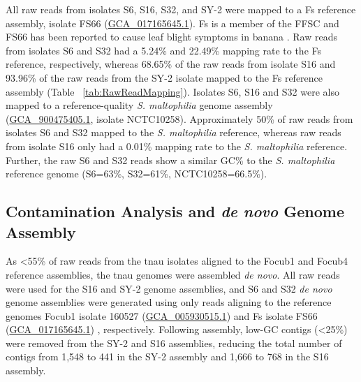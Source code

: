 All raw reads from isolates S6, S16, S32, and SY-2 were mapped to a \acf{Fs} reference assembly, isolate FS66 (\href{https://www.ncbi.nlm.nih.gov/datasets/genome/GCA_017165645.1/}{GCA\_017165645.1}). \ac{Fs} is a member of the \ac{FFSC} and FS66 has been reported to cause leaf blight symptoms in banana \parencite{Cui2021}. Raw reads from isolates S6 and S32 had a 5.24\% and 22.49\% mapping rate to the \ac{Fs} reference, respectively, whereas 68.65\% of the raw reads from isolate S16 and 93.96\% of the raw reads from the SY-2 isolate mapped to the \ac{Fs} reference assembly (Table ~\ref{tab:RawReadMapping}). Isolates S6, S16 and S32 were also mapped to a reference-quality \textit{S. maltophilia} genome assembly (\href{https://www.ncbi.nlm.nih.gov/datasets/genome/GCF_900475405.1/}{GCA\_900475405.1}, isolate NCTC10258). Approximately 50\% of raw reads from isolates S6 and S32 mapped to the \textit{S. maltophilia} reference, whereas raw reads from isolate S16 only had a 0.01\% mapping rate to the \textit{S. maltophilia} reference. Further, the raw S6 and S32 reads show a similar GC\% to the \textit{S. maltophilia} reference genome (S6=63\%, S32=61\%, NCTC10258=66.5\%).

\bigskip


\subsection{Contamination Analysis and \textit{de novo} Genome Assembly}

As <55\% of raw reads from the \ac{tnau} isolates aligned to the \ac{Focub1} and \ac{Focub4} reference assemblies, the \ac{tnau} genomes were assembled \textit{de novo}. All raw reads were used for the S16 and SY-2 genome assemblies, and S6 and S32 \textit{de novo} genome assemblies were generated using only reads aligning to the reference genomes \ac{Focub1} isolate 160527 (\href{https://www.ncbi.nlm.nih.gov/datasets/genome/GCA_005930515.1/}{GCA\_005930515.1}) \parencite{Asai2019} and \ac{Fs} isolate FS66 (\href{https://www.ncbi.nlm.nih.gov/datasets/genome/GCA_017165645.1/}{GCA\_017165645.1}) \parencite{Cui2021}, respectively. Following assembly, low-GC contigs  (\textless 25\%) were removed from the SY-2 and S16 assemblies, reducing the total number of contigs from 1,548 to 441 in the SY-2 assembly and 1,666 to 768 in the S16 assembly.  

